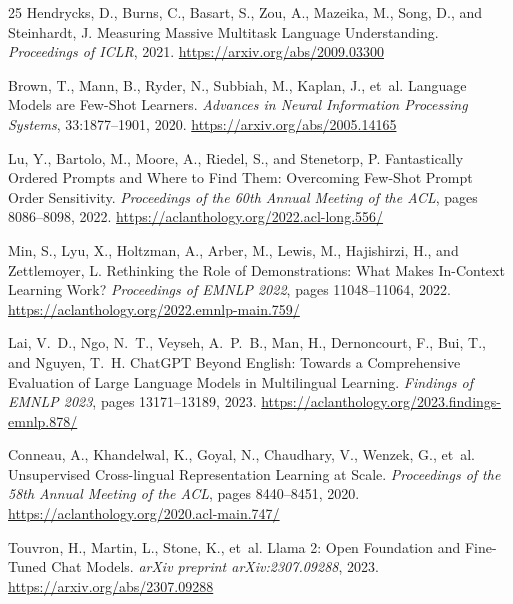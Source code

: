 \documentclass[11pt,a4paper]{article}
\begin{document}
\begin{thebibliography}{25}
Hendrycks, D., Burns, C., Basart, S., Zou, A., Mazeika, M., Song, D., and Steinhardt, J.
\newblock Measuring Massive Multitask Language Understanding.
\newblock \emph{Proceedings of ICLR}, 2021.
\newblock \url{https://arxiv.org/abs/2009.03300}

Brown, T., Mann, B., Ryder, N., Subbiah, M., Kaplan, J., et~al.
\newblock Language Models are Few-Shot Learners.
\newblock \emph{Advances in Neural Information Processing Systems}, 33:1877--1901, 2020.
\newblock \url{https://arxiv.org/abs/2005.14165}

Lu, Y., Bartolo, M., Moore, A., Riedel, S., and Stenetorp, P.
\newblock Fantastically Ordered Prompts and Where to Find Them: Overcoming Few-Shot Prompt Order Sensitivity.
\newblock \emph{Proceedings of the 60th Annual Meeting of the ACL}, pages 8086--8098, 2022.
\newblock \url{https://aclanthology.org/2022.acl-long.556/}

Min, S., Lyu, X., Holtzman, A., Arber, M., Lewis, M., Hajishirzi, H., and Zettlemoyer, L.
\newblock Rethinking the Role of Demonstrations: What Makes In-Context Learning Work?
\newblock \emph{Proceedings of EMNLP 2022}, pages 11048--11064, 2022.
\newblock \url{https://aclanthology.org/2022.emnlp-main.759/}

Lai, V.~D., Ngo, N.~T., Veyseh, A.~P.~B., Man, H., Dernoncourt, F., Bui, T., and Nguyen, T.~H.
\newblock ChatGPT Beyond English: Towards a Comprehensive Evaluation of Large Language Models in Multilingual Learning.
\newblock \emph{Findings of EMNLP 2023}, pages 13171--13189, 2023.
\newblock \url{https://aclanthology.org/2023.findings-emnlp.878/}

Conneau, A., Khandelwal, K., Goyal, N., Chaudhary, V., Wenzek, G., et~al.
\newblock Unsupervised Cross-lingual Representation Learning at Scale.
\newblock \emph{Proceedings of the 58th Annual Meeting of the ACL}, pages 8440--8451, 2020.
\newblock \url{https://aclanthology.org/2020.acl-main.747/}

Touvron, H., Martin, L., Stone, K., et~al.
\newblock Llama 2: Open Foundation and Fine-Tuned Chat Models.
\newblock \emph{arXiv preprint arXiv:2307.09288}, 2023.
\newblock \url{https://arxiv.org/abs/2307.09288}


\end{thebibliography}
\end{document}
